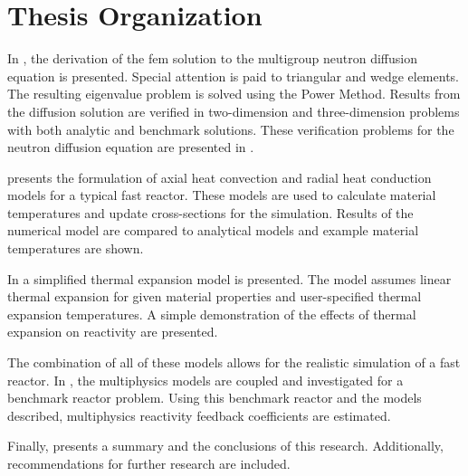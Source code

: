 \section{Thesis Organization}
  In , the derivation of the \gls{fem} solution to
  the multigroup neutron diffusion equation is presented. Special attention is
  paid to triangular and wedge elements. The resulting eigenvalue problem is
  solved using the Power Method. Results from the diffusion solution are
  verified in two-dimension and three-dimension problems with both analytic and
  benchmark solutions. These verification problems for the neutron diffusion
  equation are presented in .

   presents the formulation of axial heat convection
  and radial heat conduction models for a typical fast reactor. These models are 
  used to calculate material temperatures and update cross-sections for the 
  simulation. Results of the numerical model are compared to analytical models 
  and example material temperatures are shown.

  In  a simplified thermal expansion model is
  presented. The model assumes linear thermal expansion for given material
  properties and user-specified thermal expansion temperatures. A simple
  demonstration of the effects of thermal expansion on reactivity are presented.

  The combination of all of these models allows for the realistic simulation of
  a fast reactor. In , the multiphysics models are
  coupled and investigated for a benchmark reactor problem. Using this benchmark
  reactor and the models described, multiphysics reactivity feedback
  coefficients are estimated.
 
  Finally,  presents a summary and the conclusions of this
  research. Additionally, recommendations for further research are included.
